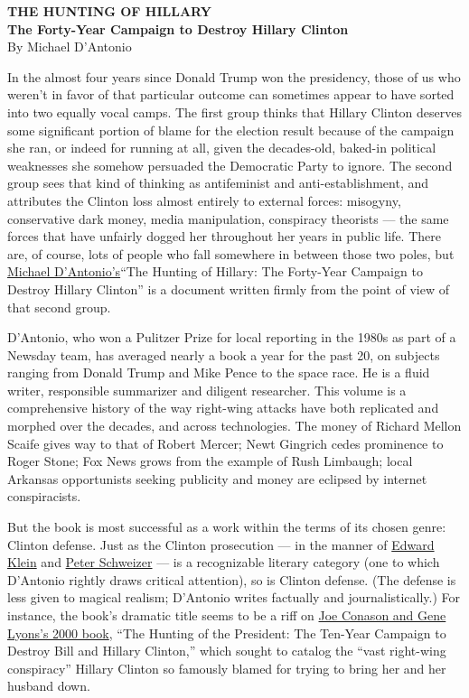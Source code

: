 \textbf{THE HUNTING OF HILLARY}\\
\textbf{The Forty-Year Campaign to Destroy Hillary Clinton}\\
By Michael D'Antonio

In the almost four years since Donald Trump won the presidency, those of
us who weren't in favor of that particular outcome can sometimes appear
to have sorted into two equally vocal camps. The first group thinks that
Hillary Clinton deserves some significant portion of blame for the
election result because of the campaign she ran, or indeed for running
at all, given the decades-old, baked-in political weaknesses she somehow
persuaded the Democratic Party to ignore. The second group sees that
kind of thinking as antifeminist and anti-establishment, and attributes
the Clinton loss almost entirely to external forces: misogyny,
conservative dark money, media manipulation, conspiracy theorists ---
the same forces that have unfairly dogged her throughout her years in
public life. There are, of course, lots of people who fall somewhere in
between those two poles, but
\href{https://www.michaeldantonio.net}{Michael D'Antonio's}``The Hunting
of Hillary: The Forty-Year Campaign to Destroy Hillary Clinton'' is a
document written firmly from the point of view of that second group.

D'Antonio, who won a Pulitzer Prize for local reporting in the 1980s as
part of a Newsday team, has averaged nearly a book a year for the past
20, on subjects ranging from Donald Trump and Mike Pence to the space
race. He is a fluid writer, responsible summarizer and diligent
researcher. This volume is a comprehensive history of the way right-wing
attacks have both replicated and morphed over the decades, and across
technologies. The money of Richard Mellon Scaife gives way to that of
Robert Mercer; Newt Gingrich cedes prominence to Roger Stone; Fox News
grows from the example of Rush Limbaugh; local Arkansas opportunists
seeking publicity and money are eclipsed by internet conspiracists.

But the book is most successful as a work within the terms of its chosen
genre: Clinton defense. Just as the Clinton prosecution --- in the
manner of
\href{https://www.amazon.com/Edward-Klein/e/B000AP7VCK\%3Fref=dbs_a_mng_rwt_scns_share}{Edward
Klein} and \href{http://peterschweizer.com}{Peter Schweizer} --- is a
recognizable literary category (one to which D'Antonio rightly draws
critical attention), so is Clinton defense. (The defense is less given
to magical realism; D'Antonio writes factually and journalistically.)
For instance, the book's dramatic title seems to be a riff on
\href{https://www.nytimes.com/2000/04/09/books/conspiracy-theories.html}{Joe
Conason and Gene Lyons's 2000 book}, ``The Hunting of the President: The
Ten-Year Campaign to Destroy Bill and Hillary Clinton,'' which sought to
catalog the ``vast right-wing conspiracy'' Hillary Clinton so famously
blamed for trying to bring her and her husband down.

